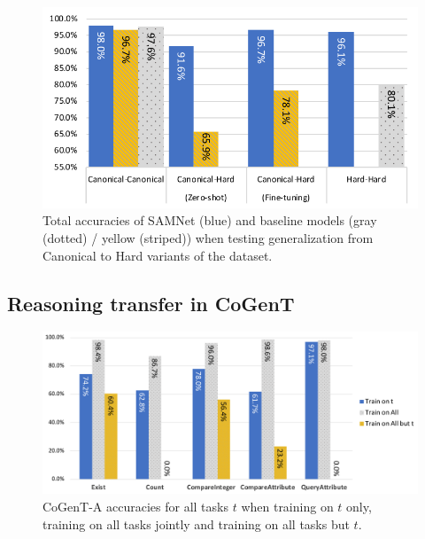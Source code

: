 \begin{figure}[htbp]
	\centering
	\includegraphics[width=\columnwidth]{../results/samnet_cog_overall_transfer_new.pdf}
	\caption{Total accuracies of SAMNet (blue) and baseline models (gray (dotted) / yellow (striped)) when testing generalization from Canonical to Hard variants of the dataset.}
	\label{fig:samnet_cog_overall_transfer}
\end{figure}


\subsection{Reasoning transfer in CoGenT}
\label{sec:reasoning-clevr}

\begin{figure}[htbp]
	\centering
	\includegraphics[width=\columnwidth]{../results/CoGenT_results_new.pdf}
	\caption{CoGenT-A accuracies for all tasks $t$ when training on $t$ only, training on all tasks jointly and training on all tasks but $t$.}
	\label{fig:CoGenT-results}
\end{figure}

